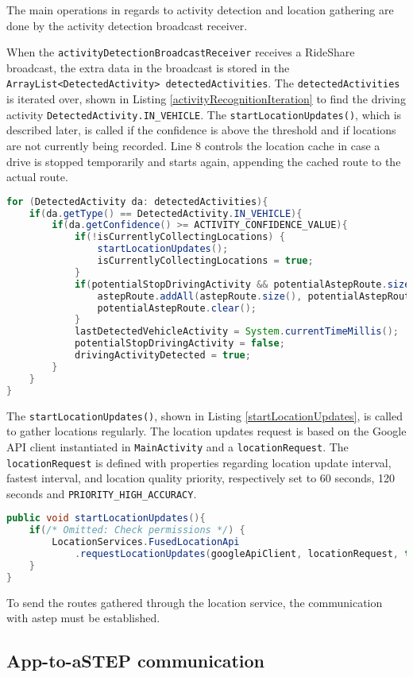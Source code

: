 


The main operations in regards to activity detection and location gathering are done by the activity detection broadcast receiver.

When the \texttt{activityDetectionBroadcastReceiver} receives a RideShare broadcast, the extra data in the broadcast is stored in the \texttt{ArrayList<DetectedActivity> detectedActivities}.
The \texttt{detectedActivities} is iterated over, shown in Listing \ref{activityRecognitionIteration} to find the driving activity \texttt{DetectedActivity.IN\_VEHICLE}.
The \texttt{startLocationUpdates()}, which is described later, is called if the confidence is above the threshold and if locations are not currently being recorded.
Line 8 controls the location cache in case a drive is stopped temporarily and starts again, appending the cached route to the actual route.

\begin{lstlisting}[language=Java, label=activityRecognitionIteration, caption=Iteration over received list of activity recognition.]
for (DetectedActivity da: detectedActivities){
	if(da.getType() == DetectedActivity.IN_VEHICLE){
		if(da.getConfidence() >= ACTIVITY_CONFIDENCE_VALUE){
			if(!isCurrentlyCollectingLocations) {
				startLocationUpdates();
				isCurrentlyCollectingLocations = true;
			}
			if(potentialStopDrivingActivity && potentialAstepRoute.size() > 0){
				astepRoute.addAll(astepRoute.size(), potentialAstepRoute);
				potentialAstepRoute.clear();
			}
			lastDetectedVehicleActivity = System.currentTimeMillis();
			potentialStopDrivingActivity = false;
			drivingActivityDetected = true;
		}
	}
}
\end{lstlisting}

The \texttt{startLocationUpdates()}, shown in Listing \ref{startLocationUpdates}, is called to gather locations regularly.
The location updates request is based on the Google API client instantiated in \texttt{MainActivity} and a \texttt{locationRequest}.
The \texttt{locationRequest} is defined with properties regarding location update interval, fastest interval, and location quality priority, respectively set to  60 seconds, 120 seconds and \texttt{PRIORITY\_HIGH\_ACCURACY}.

\begin{lstlisting}[language=Java, label=startLocationUpdates, caption=Start location updates functions.]
public void startLocationUpdates(){
	if(/* Omitted: Check permissions */) {
		LocationServices.FusedLocationApi
			.requestLocationUpdates(googleApiClient, locationRequest, this);
	}
}
\end{lstlisting}

To send the routes gathered through the location service, the communication with \gls{astep} must be established.

\subsection{App-to-aSTEP communication}
